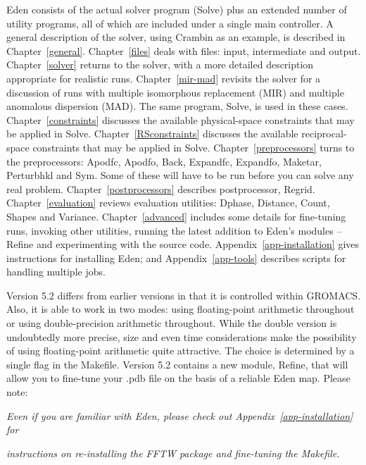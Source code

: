 \documentclass{report}
\begin{document}
Eden consists of the actual solver program (Solve) plus an 
extended number of utility programs, all of which 
are included under a single main controller.
A general description of the solver, using Crambin as an example,
is described in Chapter~\ref{general}.
Chapter~\ref{files} deals with files: input, intermediate and output.
Chapter~\ref{solver} returns to the solver, with a more detailed description 
appropriate for realistic runs.
Chapter~\ref{mir-mad} revisits the solver for a discussion of runs with
multiple isomorphous replacement (MIR) and 
multiple anomalous dispersion (MAD).
The same program, Solve, is used in these cases.
Chapter~\ref{constraints} discusses the available physical-space constraints 
that may be applied in Solve.
Chapter~\ref{RSconstraints} discusses the available reciprocal-space 
constraints that may be applied in Solve.
Chapter~\ref{preprocessors} turns to the preprocessors: 
Apodfc, Apodfo, Back, 
Expandfc, Expandfo, Maketar, 
Perturbhkl and Sym.
Some of these will have to be run before you can solve any real problem.
Chapter~\ref{postprocessors} describes postprocessor, Regrid.
Chapter~\ref{evaluation} reviews evaluation utilities: 
Dphase, Distance, Count, 
Shapes and Variance.
Chapter~\ref{advanced} includes some
details for fine-tuning runs, invoking other utilities, running 
the latest addition to Eden's modules -- Refine and
experimenting with the source code.
Appendix~\ref{app-installation}
gives instructions for installing Eden;  and
Appendix~\ref{app-tools} describes scripts for handling multiple jobs.

\vspace {0.1in}

Version 5.2 differs from earlier versions in that it is controlled within 
GROMACS.  Also, it is able to work in two modes: using floating-point 
arithmetic throughout or using double-precision arithmetic throughout.  
While the double version is undoubtedly more precise, size and even time 
considerations make the possibility of using floating-point arithmetic 
quite attractive.  The choice is determined by a single flag in the Makefile.  
Version 5.2 contains a new module, Refine, that will allow you 
to fine-tune your .pdb file on the basis of a reliable Eden map.
Please note:

{ \qq\it{Even if you are familiar with Eden, please check out Appendix~\ref{app-installation} for}
 
\qq\it{instructions on re-installing the FFTW package and fine-tuning the Makefile.}}
 
\end{document}

